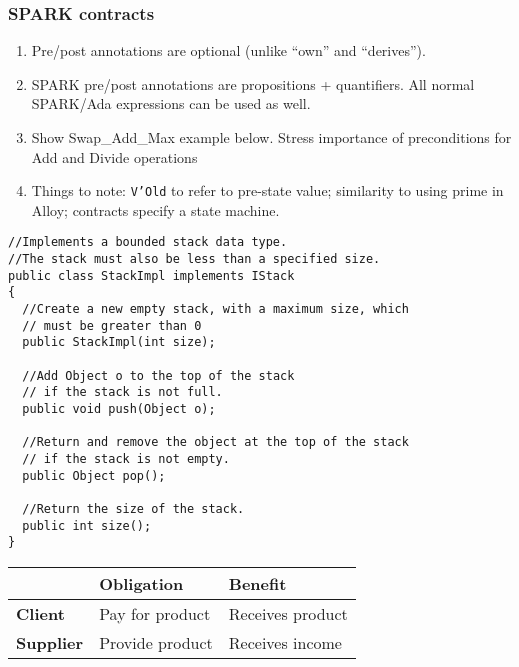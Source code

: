 \documentclass[11pt]{article}
\begin{document}
\subsubsection*{SPARK contracts}

\begin{enumerate}

 \item Pre/post annotations are optional (unlike ``own'' and ``derives'').

 \item SPARK pre/post annotations are propositions + quantifiers. All normal SPARK/Ada expressions can be used as well.

  \item Show Swap\_Add\_Max example below. Stress importance of preconditions for Add and Divide operations

 \item Things to note: \texttt{V'Old} to refer to pre-state value; similarity to using prime in Alloy; contracts specify a state machine.

\end{enumerate}

\pagebreak

\lstset{language=Java}
\lstset{aboveskip=3mm}
\begin{lstlisting}
//Implements a bounded stack data type.
//The stack must also be less than a specified size.
public class StackImpl implements IStack
{
  //Create a new empty stack, with a maximum size, which
  // must be greater than 0
  public StackImpl(int size);

  //Add Object o to the top of the stack
  // if the stack is not full.
  public void push(Object o);

  //Return and remove the object at the top of the stack
  // if the stack is not empty.
  public Object pop();

  //Return the size of the stack.
  public int size();
}
\end{lstlisting}

\vfill

\begin{center}
\begin{tabular}{lll}
\toprule
   & \textbf{Obligation} & \textbf{Benefit}\\
\midrule
 \textbf{Client} & Pay for product & Receives product \\
 \textbf{Supplier}  & Provide product & Receives income\\
\bottomrule
\end{tabular}
\end{center}
\end{document}
